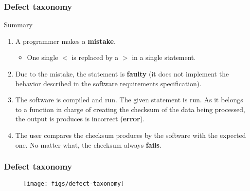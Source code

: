 \begin{frame}
\frametitle{Defect taxonomy}

\begin{block:procedure}{Summary}
\begin{enumerate}
	\item A programmer makes a \textbf{mistake}.
	\begin{itemize}
		\item One single $<$ is replaced by a $>$ in a single statement.
	\end{itemize}

	\item Due to the mistake, the statement is \textbf{faulty} (it does
	not implement the behavior described in the software requirements
	specification).

	\item The software is compiled and run. The given statement is run. As it
	belongs to a function in charge of creating the checksum of the data being
	processed, the output is produces is incorrect (\textbf{error}).

	\item The user compares the checksum produces by the software with the
	expected one. No matter what, the checksum always \textbf{fails}.
\end{enumerate}
\end{block:procedure}
\end{frame}



\begin{frame}[c, hasprev=true, hasnext=false]
\label{concept:defect-taxonomy}
\frametitle{Defect taxonomy}

\begin{figure}
    \centering
    \texttt{[image: figs/defect-taxonomy]}
\end{figure}

\hfill
{}
\end{frame}

